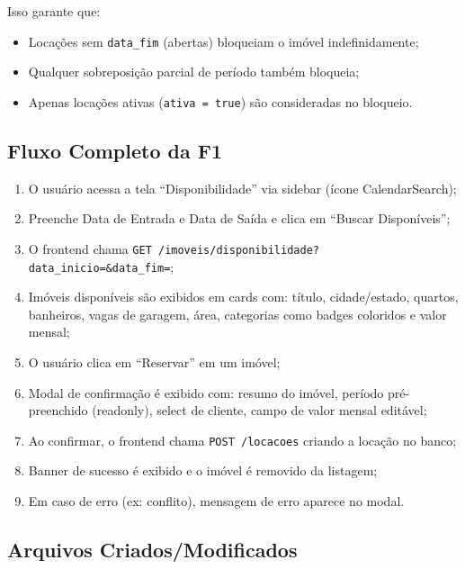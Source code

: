 \documentclass[12pt, a4paper]{article}
\begin{document}
Isso garante que:
\begin{itemize}[leftmargin=1.5em]
  \item Locações sem \texttt{data\_fim} (abertas) bloqueiam o imóvel indefinidamente;
  \item Qualquer sobreposição parcial de período também bloqueia;
  \item Apenas locações ativas (\texttt{ativa = true}) são consideradas no bloqueio.
\end{itemize}

\subsection{Fluxo Completo da F1}

\begin{enumerate}[leftmargin=1.5em]
  \item O usuário acessa a tela ``Disponibilidade'' via sidebar (ícone CalendarSearch);
  \item Preenche Data de Entrada e Data de Saída e clica em ``Buscar Disponíveis'';
  \item O frontend chama \texttt{GET /imoveis/disponibilidade?data\_inicio=\&data\_fim=};
  \item Imóveis disponíveis são exibidos em cards com: título, cidade/estado, quartos, banheiros, vagas de garagem, área, categorias como badges coloridos e valor mensal;
  \item O usuário clica em ``Reservar'' em um imóvel;
  \item Modal de confirmação é exibido com: resumo do imóvel, período pré-preenchido (readonly), select de cliente, campo de valor mensal editável;
  \item Ao confirmar, o frontend chama \texttt{POST /locacoes} criando a locação no banco;
  \item Banner de sucesso é exibido e o imóvel é removido da listagem;
  \item Em caso de erro (ex: conflito), mensagem de erro aparece no modal.
\end{enumerate}

\subsection{Arquivos Criados/Modificados}
\end{document}
